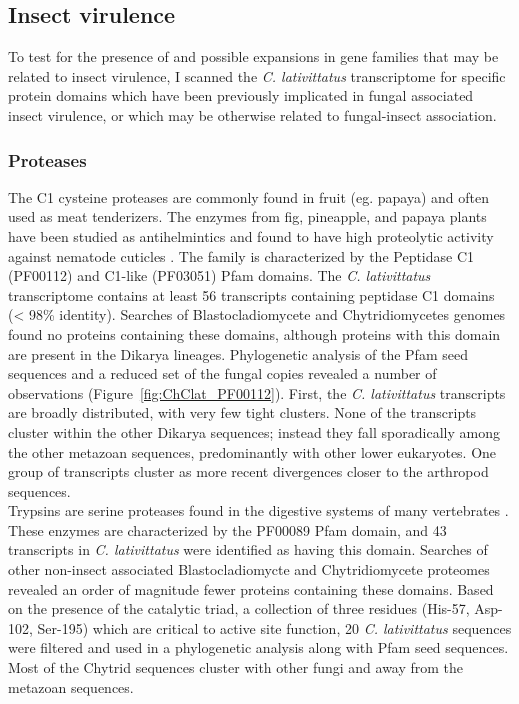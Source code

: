 \subsection*{Insect virulence}
\indent To test for the presence of and possible expansions in gene families that may be related to insect virulence, I scanned the \textit{C. lativittatus} transcriptome for specific protein domains which have been previously implicated in fungal associated insect virulence, or which may be otherwise related to fungal-insect association. \\
\subsubsection*{Proteases}
The C1 cysteine proteases are commonly found in fruit (eg. papaya) and often used as meat tenderizers. The enzymes from fig, pineapple, and papaya plants have been studied as antihelmintics and found to have high proteolytic activity against nematode cuticles \cite{Stepek2004}. The family is characterized by the Peptidase C1 (PF00112) and C1-like (PF03051) Pfam domains. The \textit{C. lativittatus} transcriptome contains at least 56 transcripts containing peptidase C1 domains (< 98\% identity). Searches of Blastocladiomycete and Chytridiomycetes genomes found no proteins containing these domains, although proteins with this domain are present in the Dikarya lineages. Phylogenetic analysis of the Pfam seed sequences and a reduced set of the fungal copies revealed a number of observations (Figure~\ref{fig:ChClat_PF00112}). First, the \textit{C. lativittatus} transcripts are broadly distributed, with very few tight clusters. None of the transcripts cluster within the other Dikarya sequences; instead they fall sporadically among the other metazoan sequences, predominantly with other lower eukaryotes. One group of transcripts cluster as more recent divergences closer to the arthropod sequences. \\
\indent Trypsins are serine proteases found in the digestive systems of many vertebrates \cite{Rawlings1994}. These enzymes are characterized by the PF00089 Pfam domain, and 43 transcripts in \textit{C. lativittatus} were identified as having this domain. Searches of other non-insect associated Blastocladiomycte and Chytridiomycete proteomes revealed an order of magnitude fewer proteins containing these domains. Based on the presence of the catalytic triad, a collection of three residues (His-57, Asp-102, Ser-195) which are critical to active site function, 20 \textit{C. lativittatus} sequences were filtered and used in a phylogenetic analysis along with Pfam seed sequences. Most of the Chytrid sequences cluster with other fungi and away from the metazoan sequences.\\
